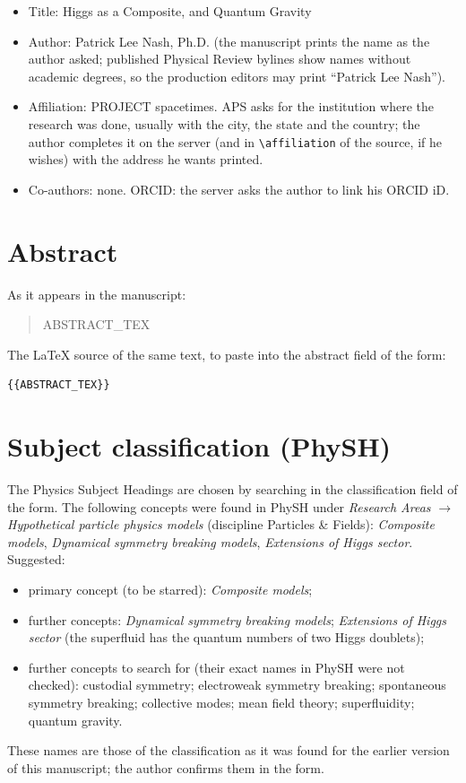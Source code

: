 \documentclass[11pt]{article}
\begin{document}
\begin{itemize}
\item Title: Higgs as a Composite, and Quantum Gravity
\item Author: Patrick Lee Nash, Ph.D. (the manuscript prints the name as the author asked; published Physical Review
bylines show names without academic degrees, so the production editors may print ``Patrick Lee Nash'').
\item Affiliation: PROJECT spacetimes. APS asks for the institution where the research was done, usually with the city,
the state and the country; the author completes it on the server (and in \texttt{\textbackslash affiliation} of the
source, if he wishes) with the address he wants printed.
\item Co-authors: none. ORCID: the server asks the author to link his ORCID iD.
\end{itemize}

\section{Abstract}
\label{sec:abstract}

As it appears in the manuscript:

\begin{quote}
{{ABSTRACT_TEX}}
\end{quote}

The LaTeX source of the same text, to paste into the abstract field of the form:

\begin{lstlisting}
{{ABSTRACT_TEX}}
\end{lstlisting}

\section{Subject classification (PhySH)}
\label{sec:physh}

The Physics Subject Headings are chosen by searching in the classification field of the form. The following concepts
were found in PhySH under \emph{Research Areas} $\to$ \emph{Hypothetical particle physics models} (discipline Particles
\& Fields): \emph{Composite models}, \emph{Dynamical symmetry breaking models}, \emph{Extensions of Higgs sector}. Suggested:
\begin{itemize}
\item primary concept (to be starred): \emph{Composite models};
\item further concepts: \emph{Dynamical symmetry breaking models}; \emph{Extensions of Higgs sector} (the superfluid has
the quantum numbers of two Higgs doublets);
\item further concepts to search for (their exact names in PhySH were not checked): custodial symmetry; electroweak
symmetry breaking; spontaneous symmetry breaking; collective modes; mean field theory; superfluidity; quantum gravity.
\end{itemize}
These names are those of the classification as it was found for the earlier version of this manuscript; the author
confirms them in the form.
\end{document}
